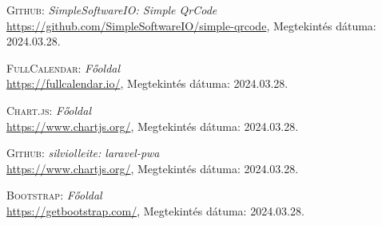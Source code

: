 \documentclass[
]{thesis-ekf}
\theoremstyle{definition}
\theoremstyle{remark}
\begin{document}
\begin{thebibliography}{19}
\textsc{Github}: \emph{SimpleSoftwareIO: Simple QrCode}
\\
\url{https://github.com/SimpleSoftwareIO/simple-qrcode}, Megtekintés dátuma: 2024.03.28.

\textsc{FullCalendar}: \emph{Főoldal}
\\
\url{https://fullcalendar.io/}, Megtekintés dátuma: 2024.03.28.

\textsc{Chart.js}: \emph{Főoldal}
\\
\url{https://www.chartjs.org/}, Megtekintés dátuma: 2024.03.28.

\textsc{Github}: \emph{silviolleite: laravel-pwa}
\\
\url{https://www.chartjs.org/}, Megtekintés dátuma: 2024.03.28.

\textsc{Bootstrap}: \emph{Főoldal}
\\
\url{https://getbootstrap.com/}, Megtekintés dátuma: 2024.03.28.

\end{thebibliography}

%
\end{document}
